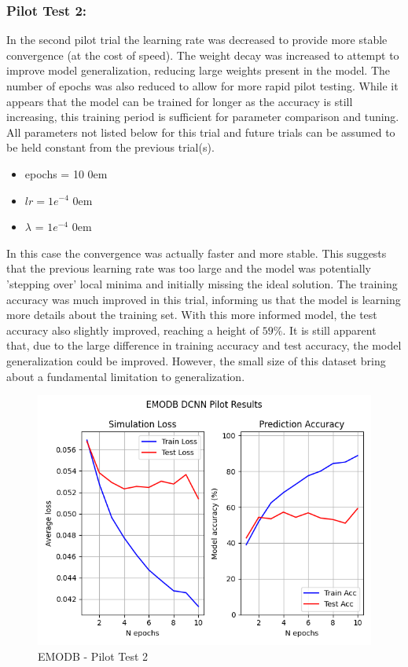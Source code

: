 \subsubsection{Pilot Test 2:}
In the second pilot trial the learning rate was decreased to provide more stable convergence (at the cost of speed). The weight decay was increased to attempt to improve model generalization, reducing large weights present in the model. The number of epochs was also reduced to allow for more rapid pilot testing. While it appears that the model can be trained for longer as the accuracy is still  increasing, this training period is sufficient for parameter comparison and tuning. All parameters not listed below for this trial and future trials can be assumed to be held constant from the previous trial(s). 
\begin{itemize}
    \item epochs = 10
    \itemsep0em
    \item $lr = 1e^{-4}$
    \itemsep0em
    \item $\lambda$ = $1e^{-4}$
    \itemsep0em
\end{itemize}
In this case the convergence was actually faster and more stable. This suggests that the previous learning rate was too large and the model was potentially 'stepping over' local minima and initially missing the ideal solution. The training accuracy was much improved in this trial, informing us that the model is learning more details about the training set. With this more informed model, the test accuracy also slightly improved, reaching a height of $59\%$. It is still apparent that, due to the large difference in training accuracy and test accuracy, the model generalization could be improved. However, the small size of this dataset bring about a fundamental limitation to generalization. 
\begin{figure}[ht]
        \centering
        \includegraphics[scale = 0.6]{images_results/EMODB_PilotTests/EMODB_PilotResults_30-05__15-59.png}
        \caption{EMODB - Pilot Test 2}
        \label{Pilot2_fig}
\end{figure}


